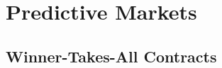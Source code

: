 \section{Predictive Markets}
\label{sec:predictive_markets}

\lipsum[2]

\subsection{Winner-Takes-All Contracts}
\label{subsec:winner_takes_all_contracts}

\lipsum[2]